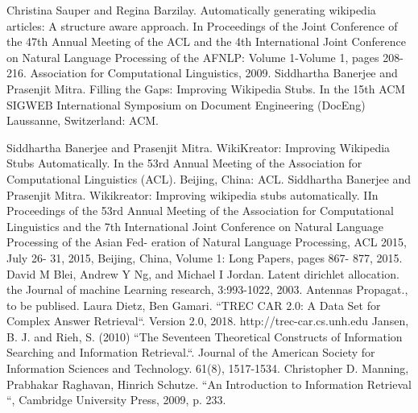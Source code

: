 \documentclass[conference]{IEEEtran}
\begin{document}
\begin{thebibliography}{9}
 Christina Sauper and Regina Barzilay. Automatically generating wikipedia articles: A structure aware
approach. In Proceedings of the Joint Conference of the 47th Annual Meeting of the ACL and the
4th International Joint Conference on Natural Language Processing of the AFNLP: Volume 1-Volume
1, pages 208-216. Association for Computational Linguistics, 2009.
 Siddhartha Banerjee and Prasenjit Mitra. Filling the Gaps: Improving Wikipedia Stubs. In
the 15th ACM SIGWEB International Symposium on Document Engineering (DocEng) Laussanne,
Switzerland: ACM.

 Siddhartha Banerjee and Prasenjit Mitra. WikiKreator: Improving Wikipedia Stubs Automatically.
In the 53rd Annual Meeting of the Association for Computational Linguistics (ACL). Beijing,
China: ACL.
 Siddhartha Banerjee and Prasenjit Mitra. Wikikreator: Improving wikipedia stubs automatically.
IIn Proceedings of the 53rd Annual Meeting of the Association for Computational Linguistics and
the 7th International Joint Conference on Natural Language Processing of the Asian Fed- eration of
Natural Language Processing, ACL 2015, July 26- 31, 2015, Beijing, China, Volume 1: Long Papers,
pages 867- 877, 2015.
 David M Blei, Andrew Y Ng, and Michael I Jordan. Latent dirichlet allocation. the Journal of
machine Learning research, 3:993-1022, 2003.
Antennas Propagat., to be publised.
 Laura Dietz, Ben Gamari. ``TREC CAR 2.0: A Data Set for Complex Answer Retrieval``. Version
2.0, 2018. http://trec-car.cs.unh.edu
 Jansen, B. J. and Rieh, S. (2010)  ``The Seventeen Theoretical Constructs of Information Searching
and Information Retrieval.``. Journal of the American Society for Information Sciences and Technology.
61(8), 1517-1534.
 Christopher D. Manning, Prabhakar Raghavan, Hinrich Schutze. ``An Introduction to Information Retrieval ``, Cambridge University Press, 2009, p. 233.
\end{thebibliography}
\end{document}
